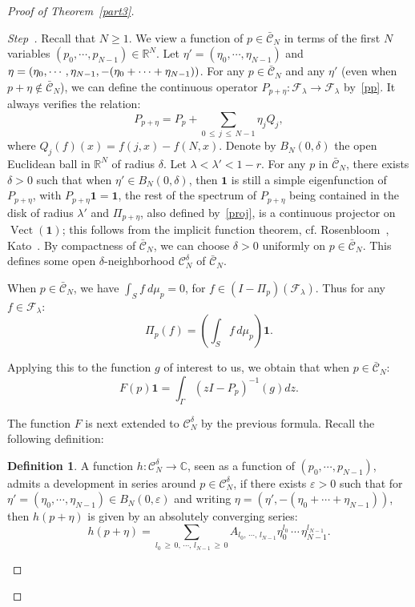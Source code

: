 \documentclass[10pt]{amsart}
\theoremstyle{definition}\newtheorem{defi}[theo]{Definition}\newtheorem{rema}[theo]{Remark}\newtheorem{exam}[theo]{Example}\newtheorem{exem}[theo]{Example}\newtheorem{nota}[theo]{Notation}
\newcommand{\Rbb}{\mathbb R}
\newcommand{\Ccl}{\mathcal{C}}
\newcommand{\Fcl}{\mathcal{F}}
\newcommand{\bfun}{\mathbf{1}}
\DeclareMathOperator{\Vect}{Vect}
\newcounter{stepcount}
\newenvironment{step}{\refstepcounter{stepcount}\begin{proof}[Step~\thestepcount]}{\let\qed\relax\end{proof}}
\providecommand{\C}{\mathbb{C}}
\begin{document}
\begin{proof}[{Proof of Theorem~\ref{part3}}]
\begin{step}
Recall that $N\geq1$. We view a function of $p\in \bar{\Ccl}_N$ in terms of the first $N$ variables $(p_0,\cdots,p_{N-1})\in\Rbb^N$. Let $\eta'=(\eta_0,\cdots,\eta_{N-1})$ and $\eta=(\eta_0,\cdots,\eta_{N-1},-(\eta_0+\cdots\linebreak+\eta_{N-1}))$. For any $p\in\bar{\Ccl}_N$ and any $\eta'$ (even when $p+\eta\not\in\bar{\Ccl}_N$), we can define the continuous operator $P_{p+\eta} : {\Fcl}_{\lambda}\rightarrow{\Fcl}_{\lambda}$ by~\eqref{pp}. It always verifies the relation:
\[
P_{p+\eta}=P_p+\sum_{0\,\leq\,j\,\leq\,N-1}\eta_jQ_j,
\]
where $Q_j(f)(x)=f(j,x)-f(N,x)$. Denote by $B_N(0,\delta)$ the open Euclidean ball in $\Rbb^N$ of radius $\delta$. Let $\lambda<\lambda'<1-r$. For any $p$ in $\bar{\Ccl}_N$, there exists $\delta>0$ such that when $\eta'\in B_N(0,\delta)$, then $\bfun$ is still a simple eigenfunction of $P_{p+\eta}$, with $P_{p+\eta}\bfun=\bfun$, the rest of the spectrum of $P_{p+\eta}$ being contained in the disk of radius $\lambda'$ and $\Pi_{p+\eta}$, also defined by~\eqref{proj}, is a continuous projector on $\Vect(\bfun)$; this follows from the implicit function theorem, cf. Rosenbloom~\cite{rosen}, Kato~\cite{kato}. By compactness of $\bar{\Ccl}_N$, we can choose $\delta>0$ uniformly on $p\in\bar{\Ccl}_N$. This defines some open $\delta$-neighborhood ${\Ccl}^{\delta}_N$ of $\bar{\Ccl}_N$.



When $p\in\bar{\Ccl}_N$, we have $\int_Sf~d\mu_p=0$, for $f\in(I-\Pi_p)({\Fcl}_{\lambda})$. Thus for any $f\in{\Fcl}_{\lambda}$:
\[
\Pi_p(f)=\left({\int_Sf\,d\mu_p}\right)\bfun.
\]



Applying this to the function $g$ of interest to us, we obtain that when $p\in\bar{\Ccl}_N$:
\[
F(p)\bfun=\int_{\Gamma}\left(zI-P_p\right)^{-1}(g)dz.
\]


The function $F$ is next extended to ${\Ccl}^{\delta}_N$ by the previous formula. Recall the following definition:


\begin{defi}
A function $h:{\Ccl}^{\delta}_N\rightarrow\C$, seen as a function of $(p_0,\cdots,p_{N-1})$, admits a development in series around $p\in{\Ccl}^{\delta}_N$, if there exists $\varepsilon>0$ such that for $\eta'=(\eta_0,\cdots,\eta_{N-1})\in B_N(0,\varepsilon)$ and writing $\eta=(\eta',-(\eta_0+\cdots+\eta_{N-1}))$, then $h(p+\eta)$ is given by an absolutely converging series:
\[
h(p+\eta)=\sum_{l_0\,\geq\,0,\,\cdots,\,l_{N-1}\,\geq\,0}A_{l_0,\,\cdots,\,l_{N-1}}\eta_0^{l_0}\,\cdots\,\eta_{N-1}^{l_{N-1}}.
\]


\end{defi}
\end{step}
\end{proof}
\end{document}
